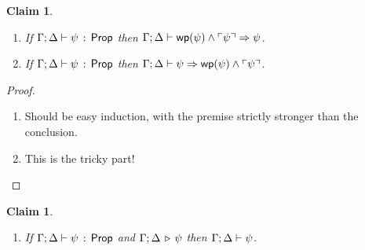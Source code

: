 \documentclass[10pt,a4paper]{article}
\newtheorem{claim}[theorem]{Claim}
\begin{document}
\begin{claim}
\mbox{}
\begin{enumerate}
  \item If $\Gamma;\Delta \vdash \psi\, :\, \mathsf{Prop}$ then
    $\Gamma;\Delta \vdash \mathop{\mathsf{wp}}(\psi) \wedge \ulcorner \psi \urcorner \Rightarrow \psi$.
  \item If $\Gamma;\Delta \vdash \psi\, :\, \mathsf{Prop}$ then
    $\Gamma;\Delta \vdash \psi \Rightarrow \mathop{\mathsf{wp}}(\psi) \wedge \ulcorner \psi \urcorner$.
\end{enumerate}
\end{claim}

\begin{proof}
  \begin{enumerate}
  \item Should be easy induction, with the premise strictly stronger
    than the conclusion.
  \item This is the tricky part!
  \end{enumerate}
\end{proof}

\begin{claim}
\mbox{}
\begin{enumerate}
  \item If $\Gamma;\Delta \vdash \psi\, :\, \mathsf{Prop}$ and $\Gamma;\Delta \,\triangleright\, \psi$ then
    $\Gamma;\Delta \vdash \psi$.
\end{enumerate}
\end{claim}
\end{document}
